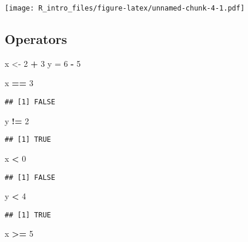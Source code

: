 \documentclass[
  a4paper,
]{article}
\newenvironment{Shaded}{\begin{snugshade}}{\end{snugshade}}
\newcommand{\DecValTok}[1]{\textcolor[rgb]{0.00,0.00,0.81}{#1}}
\newcommand{\NormalTok}[1]{#1}
\newcommand{\OtherTok}[1]{\textcolor[rgb]{0.56,0.35,0.01}{#1}}
\newcommand{\SpecialCharTok}[1]{\textcolor[rgb]{0.81,0.36,0.00}{\textbf{#1}}}
\begin{document}
\texttt{[image: R\_intro\_files/figure-latex/unnamed-chunk-4-1.pdf]}

\subsection{Operators}\label{operators}

\begin{Shaded}
\begin{Highlighting}[]
\NormalTok{x }\OtherTok{\textless{}{-}} \DecValTok{2} \SpecialCharTok{+} \DecValTok{3}
\NormalTok{y }\OtherTok{=} \DecValTok{6} \SpecialCharTok{{-}} \DecValTok{5}

\NormalTok{x }\SpecialCharTok{==} \DecValTok{3}
\end{Highlighting}
\end{Shaded}

\begin{verbatim}
## [1] FALSE
\end{verbatim}

\begin{Shaded}
\begin{Highlighting}[]
\NormalTok{y }\SpecialCharTok{!=} \DecValTok{2}
\end{Highlighting}
\end{Shaded}

\begin{verbatim}
## [1] TRUE
\end{verbatim}

\begin{Shaded}
\begin{Highlighting}[]
\NormalTok{x }\SpecialCharTok{\textless{}} \DecValTok{0}
\end{Highlighting}
\end{Shaded}

\begin{verbatim}
## [1] FALSE
\end{verbatim}

\begin{Shaded}
\begin{Highlighting}[]
\NormalTok{y }\SpecialCharTok{\textless{}} \DecValTok{4}
\end{Highlighting}
\end{Shaded}

\begin{verbatim}
## [1] TRUE
\end{verbatim}

\begin{Shaded}
\begin{Highlighting}[]
\NormalTok{x }\SpecialCharTok{\textgreater{}=} \DecValTok{5}
\end{Highlighting}
\end{Shaded}
\end{document}
